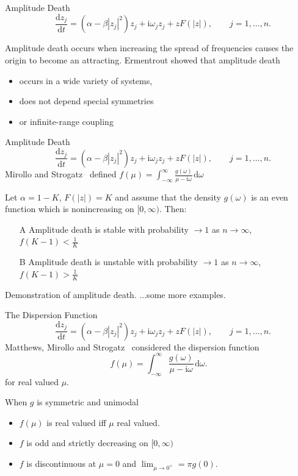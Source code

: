 \documentclass[10pt,reqno]{beamer}
\newcommand{\D}[2]{\frac{\mathrm{d} #1}{\mathrm{d} #2}}
\newcommand{\I}{\mathrm{i}}
\newcommand{\df}[1]{\mspace{2mu}  \mathrm{d}#1}
\begin{document}
\begin{frame}{Amplitude Death}
\[
\quad \D{z_j}{t} = (\alpha - \beta|z_j|^2)z_j + \I\omega_jz_j +zF(|z|), \qquad j = 1,\ldots, n.
\]

Amplitude death occurs when increasing the spread of frequencies causes the origin to become an attracting.
\vfill
Ermentrout\cite{Ermentrout90} showed that amplitude death 
\begin{itemize}
\item occurs in a wide variety of systems, 
\item does not depend special symmetries 
\item or infinite-range coupling
\end{itemize}
\end{frame}
\begin{frame}{Amplitude Death}
\[
\quad \D{z_j}{t} = (\alpha - \beta|z_j|^2)z_j + \I\omega_jz_j +zF(|z|), \qquad j = 1,\ldots, n.
\]
Mirollo and Strogatz~\cite{Mirollo90} defined
$f(\mu) = \int_{-\infty}^\infty \frac{g(\omega)}{\mu - \I\omega}\df{\omega}$
\begin{tcolorbox}[notitle, boxrule=0pt, colback=lred]
\begin{theorem}
Let $\alpha = 1-K$, $F(|z|)=K$ and assume that the density $g(\omega)$ is an even function which is nonincreasing on $[0,\infty)$.
Then: 
\begin{itemize}
	\item[A] Amplitude death is stable with 
	probability $\rightarrow 1$ as $n \rightarrow \infty$, $f(K-1) < \frac{1}{K}$
\item[B] Amplitude death is unstable with 
probability $\rightarrow 1$ as $n \rightarrow \infty$, $f(K-1) > \frac{1}{K}$
\end{itemize}
\end{theorem}
\end{tcolorbox}
\end{frame}
\begin{frame}{Demonstration of amplitude death.}
\centering
\vfill
...some more examples.
\end{frame}
\begin{frame}{The Dispersion Function}
\[
\quad \D{z_j}{t} = (\alpha - \beta|z_j|^2)z_j + \I\omega_jz_j +zF(|z|), \qquad j = 1,\ldots, n.
\]
Matthews, Mirollo and Strogatz~\cite{Matthews91} considered the dispersion function
\[f(\mu) = \int_{-\infty}^\infty \frac{g(\omega)}{\mu - \I\omega}\df{\omega}.\]
for real valued $\mu$.

When $g$ is symmetric and unimodal
\begin{itemize}
\item $f(\mu)$ is real valued iff $\mu$ real valued.
\item $f$ is odd and strictly decreasing on $[0,\infty)$
\item $f$ is discontinuous at $\mu=0$ and $\lim_{\mu\rightarrow 0^+} = \pi g(0)$.
\end{itemize}
\end{frame}
\end{document}
